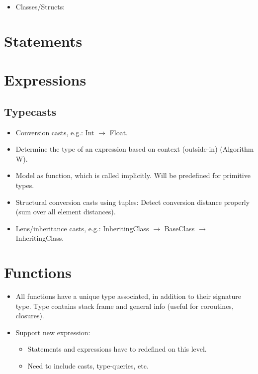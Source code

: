 \begin{itemize}
	\item Classes/Structs:
\end{itemize}

\section{Statements}

\section{Expressions}
\subsection{Typecasts}
\begin{itemize}
	\item Conversion casts, e.g.: Int $\to$ Float.
	\item Determine the type of an expression based on context (outside-in) (Algorithm W).
	\item Model as function, which is called implicitly. Will be predefined for primitive types.
	\item Structural conversion casts using tuples: Detect conversion distance properly (sum over all element distances).
	\item Lens/inheritance casts, e.g.: InheritingClass $\to$ BaseClass $\to$ InheritingClass.
\end{itemize}

\section{Functions}
\begin{itemize}
	\item All functions have a unique type associated, in addition to their signature type.
		Type contains stack frame and general info (useful for coroutines, closures).
	\item Support new expression:
		\begin{itemize}
			\item Statements and expressions have to redefined on this level.
			\item Need to include casts, type-queries, etc.
		\end{itemize}
\end{itemize}

